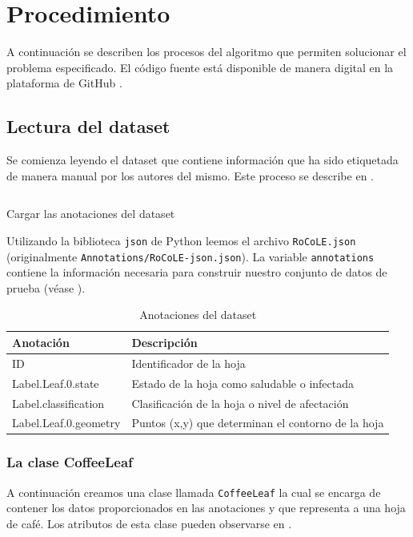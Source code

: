 \chapter{Procedimiento}
A continuación se describen los procesos del algoritmo que permiten solucionar el problema especificado. El código fuente está disponible de manera digital en la plataforma de GitHub \cite{Dominguez-Ordonez_Coffee_Leaves_Classification_2025}.

\section{Lectura del dataset}
Se comienza leyendo el dataset que contiene información que ha sido etiquetada de manera manual por los autores del mismo. Este proceso se describe en .

\begin{listing}[H]
\inputminted{python}{code_listings/load_dataset.py}
\caption{Cargar las anotaciones del dataset}
\label{code:load_dataset}
\end{listing}

Utilizando la biblioteca \texttt{json} de Python leemos el archivo \texttt{RoCoLE.json} (originalmente \texttt{Annotations/RoCoLE-json.json}). La variable \texttt{annotations} contiene la información necesaria para construir nuestro conjunto de datos de prueba (véase ).

\begin{table}[H]
\centering
\begin{tabular}{|l|l|}
\hline 
\textbf{Anotación} & \textbf{Descripción} \\ 
\hline 
ID & Identificador de la hoja \\ 
\hline 
Label.Leaf.0.state & Estado de la hoja como saludable o infectada \\ 
\hline 
Label.classification & Clasificación de la hoja o nivel de afectación \\ 
\hline 
Label.Leaf.0.geometry & Puntos (x,y) que determinan el contorno de la hoja \\ 
\hline 
\end{tabular}
\caption{Anotaciones del dataset}
\label{table:required_annotations}
\end{table}

\subsection{La clase CoffeeLeaf}
A continuación creamos una clase llamada \texttt{CoffeeLeaf} la cual se encarga de contener los datos proporcionados en las anotaciones y que representa a una hoja de café. Los atributos de esta clase pueden observarse en .

